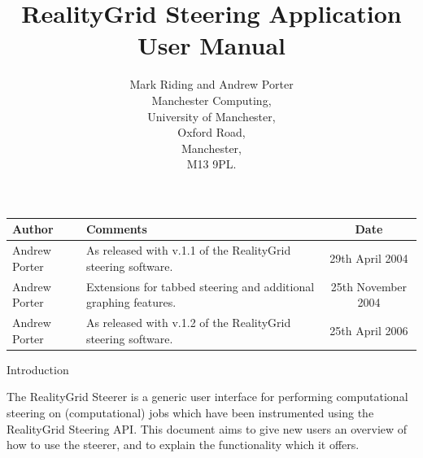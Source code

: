 \documentclass[a4paper,twoside]{article}
\begin{document}
\title{RealityGrid Steering Application User Manual}

\author{Mark Riding and Andrew Porter\\
Manchester Computing,\\University of Manchester,\\Oxford Road,\\
Manchester,\\M13 9PL.}

\maketitle

\begin{table}
\begin{center}
\begin{tabular}{l|p{5cm}|c}
\hline\hline
Author & Comments & Date \\
\hline
Andrew Porter & As released with v.1.1 of the RealityGrid steering software. & 29th April 2004 \\
Andrew Porter & Extensions for tabbed steering and additional graphing features. & 25th November 2004 \\
Andrew Porter & As released with v.1.2 of the RealityGrid steering software. & 25th April 2006\\
\hline\hline
\end{tabular}
\end{center}
\end{table}

\pagebreak

\tableofcontents

\pagebreak

\begin{section}{Introduction}

The RealityGrid Steerer is a generic user interface for performing
computational steering on (computational) jobs which have been
instrumented using the RealityGrid Steering API. This document aims to
give new users an overview of how to use the steerer, and to explain
the functionality which it offers.

\end{section}

\end{document}
